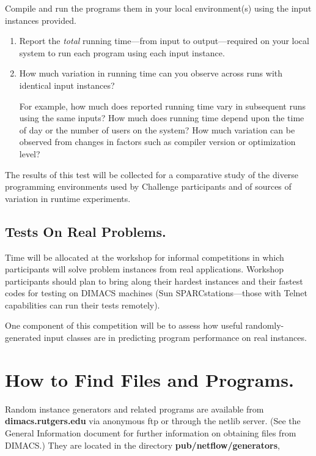 Compile and run the programs them in your local environment(s) using
the input instances provided.

\begin{enumerate}
\item  Report the {\em total} running time---from input to 
output---required on your local system to run each program using each
input instance.

\item  How much variation in running time can you observe 
across runs with identical input instances?

For example, how much does reported running time vary in subsequent
runs using the same inputs?  How much does running time depend upon
the time of day or the number of users on the system?  How much
variation can be observed from changes in factors such as compiler
version or optimization level?
\end{enumerate} 

The results of this test will be collected for a comparative study of
the diverse programming environments used by Challenge participants
and of sources of variation in runtime experiments.

\subsection{Tests On Real Problems.}

Time will be allocated at the workshop for informal competitions in
which participants will solve problem instances from real
applications.  Workshop participants should plan to bring along their
hardest instances and their fastest codes for testing on DIMACS
machines (Sun SPARCstations---those with Telnet capabilities can run
their tests remotely).

One component of this competition will be to assess how useful
randomly-generated input classes are in predicting program performance
on real instances.

\section{How to Find Files and Programs.} 

Random instance generators and related programs are available from
{\bf dimacs.rutgers.edu} via anonymous ftp or through the netlib
server.  (See the General Information document for further information
on obtaining files from DIMACS.)  They are located in the directory
{\bf pub/netflow/generators},

